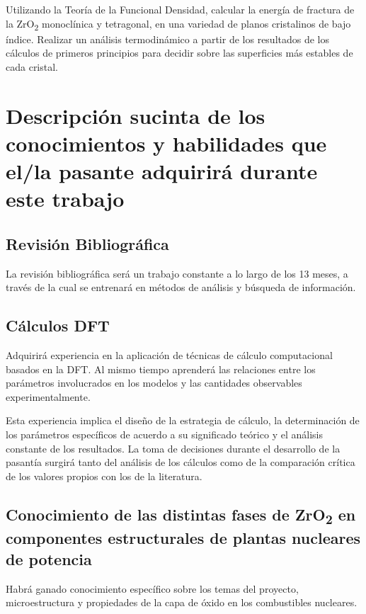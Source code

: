 Utilizando la Teoría de la Funcional Densidad, calcular la energía de fractura de la
ZrO\textsubscript{2} monoclínica y tetragonal, en una variedad de planos cristalinos de bajo índice.
Realizar un análisis termodinámico a partir de los resultados de los 
cálculos de primeros principios  para decidir sobre las superficies más
estables de cada cristal. 

\section{Descripción sucinta de los conocimientos y habilidades que el/la  
pasante adquirirá durante este trabajo }

\subsection{ Revisión Bibliográfica}

La revisión bibliográfica será un trabajo constante a lo largo de los 13 meses, 
a través de la cual se entrenará en métodos de análisis y búsqueda de 
información.

\subsection{ Cálculos DFT}

Adquirirá experiencia en la aplicación de técnicas de cálculo computacional 
basados en la DFT. Al mismo tiempo aprenderá las relaciones entre los 
parámetros involucrados en los modelos y las cantidades observables 
experimentalmente.

Esta experiencia implica el diseño de la estrategia de cálculo, la 
determinación de los parámetros específicos de acuerdo a su significado teórico 
y el análisis constante de los resultados. La toma de decisiones durante el 
desarrollo de la pasantía surgirá tanto del análisis de los cálculos
como de la 
comparación crítica de los valores propios con los de la literatura.

\subsection{ Conocimiento de las distintas fases de ZrO\textsubscript{2} en 
componentes estructurales de plantas nucleares de potencia}

Habrá ganado conocimiento específico sobre los temas del proyecto, 
microestructura y propiedades de la capa de óxido en los combustibles nucleares. 

